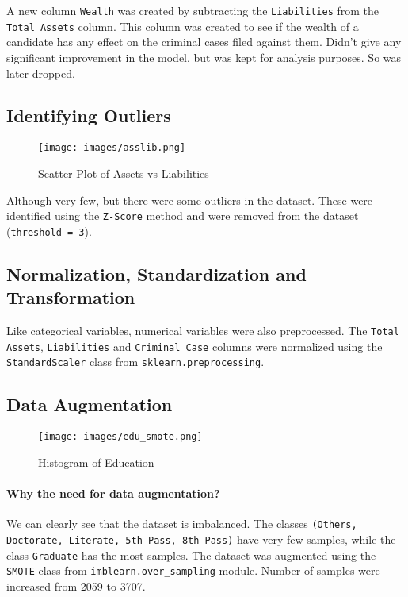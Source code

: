 \documentclass{article}
\begin{document}
A new column \texttt{Wealth} was created by subtracting the \texttt{Liabilities} from the \texttt{Total Assets} column.
This column was created to see if the wealth of a candidate has any effect on the criminal cases filed against them.
Didn't give any significant improvement in the model, but was kept for analysis purposes. So was later dropped.

\subsection{Identifying Outliers}

\begin{figure}[h]
    \centering
    \texttt{[image: images/asslib.png]}
    \caption{Scatter Plot of Assets vs Liabilities}
    \label{fig:asslib}
\end{figure}

Although very few, but there were some outliers in the dataset.
These were identified using the \texttt{Z-Score} method and were removed from the dataset (\texttt{threshold = 3}).

\subsection{Normalization, Standardization and Transformation}

Like categorical variables, numerical variables were also preprocessed.
The \texttt{Total Assets}, \texttt{Liabilities} and \texttt{Criminal Case} columns were normalized using the \texttt{StandardScaler} class from \texttt{sklearn.preprocessing}. \cite{scikit-learn}

\subsection{Data Augmentation}
\begin{figure}[h]
    \centering
    \texttt{[image: images/edu\_smote.png]}
    \caption{Histogram of Education}
    \label{fig:edu}
\end{figure}


\paragraph{Why the need for data augmentation?}{
    We can clearly see that the dataset is imbalanced.
    The classes \texttt{(Others, Doctorate, Literate, 5th Pass, 8th Pass)} have
    very few samples, while the class \texttt{Graduate} has the most samples.
    The dataset was augmented using the \texttt{SMOTE} class from \texttt{imblearn.over\_sampling} module. \cite{imbalanced-learn}
    Number of samples were increased from 2059 to 3707. {\cite{Cha02}}
}
\end{document}
